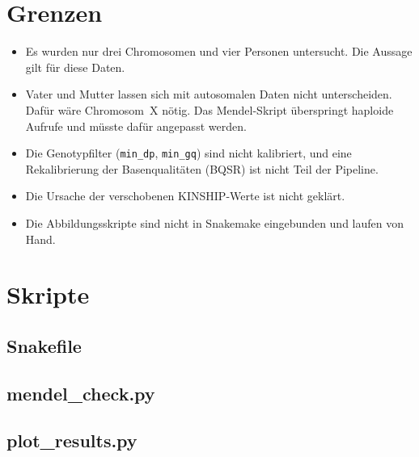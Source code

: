 \documentclass[10pt,a4paper,twocolumn]{article}
\begin{document}
\section{Grenzen}
\begin{itemize}
  \item Es wurden nur drei Chromosomen und vier Personen untersucht. Die Aussage gilt für diese Daten.
  \item Vater und Mutter lassen sich mit autosomalen Daten nicht unterscheiden. Dafür wäre Chromosom~X nötig. Das Mendel-Skript überspringt haploide Aufrufe und müsste dafür angepasst werden.
  \item Die Genotypfilter (\texttt{min\_dp}, \texttt{min\_gq}) sind nicht kalibriert, und eine Rekalibrierung der Basenqualitäten (BQSR) ist nicht Teil der Pipeline.
  \item Die Ursache der verschobenen KINSHIP-Werte ist nicht geklärt.
  \item Die Abbildungsskripte sind nicht in Snakemake eingebunden und laufen von Hand.
\end{itemize}




\appendix
\section{Skripte}
\subsection*{Snakefile}\label{app:snake}

\subsection*{mendel\_check.py}

\subsection*{plot\_results.py}

\end{document}
